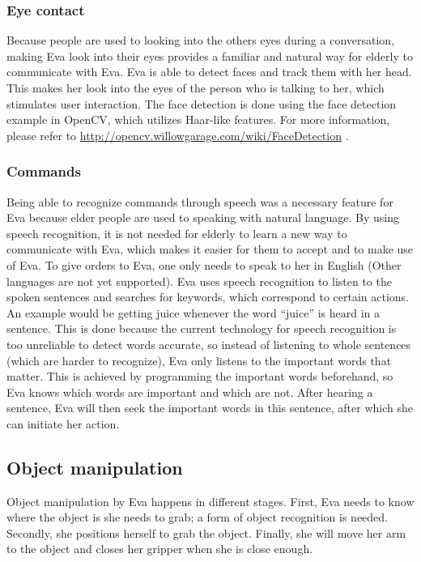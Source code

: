 \documentclass[project_eva.tex]{subfiles}
\begin{document}
\subsubsection*{Eye contact}
Because people are used to looking into the other\textquotesingle s eyes during a conversation, making Eva look into 
their eyes provides a familiar and natural way for elderly to communicate with Eva. Eva is able to detect faces and 
track them with her head. This makes her look into the eyes of the person who is talking to her, which stimulates user 
interaction. The face detection is done using the face detection example in OpenCV, which utilizes Haar-like features. 
For more information, please refer to \url{http://opencv.willowgarage.com/wiki/FaceDetection} \cite{FaceDetection} .

\subsubsection*{Commands}
Being able to recognize commands through speech was a necessary feature for Eva because elder people are used to speaking 
with natural language. By using speech recognition, it is not needed for elderly to learn a new way to communicate with 
Eva, which makes it easier for them to accept and to make use of Eva. To give orders to Eva, one only needs to speak to 
her in English (Other languages are not yet supported). Eva uses speech recognition to listen to the spoken sentences and 
searches for keywords, which correspond to certain actions. An example would be getting juice whenever the word ``juice'' 
is heard in a sentence. This is done because the current technology for speech recognition is too unreliable to detect 
words accurate, so instead of listening to whole sentences (which are harder to recognize), Eva only listens to the 
important words that matter. This is achieved by programming the important words beforehand, so Eva knows which words are important and which are not. After hearing a sentence, Eva will then seek the important words in this sentence, after which she can initiate her action.

\subsection*{Object manipulation}
Object manipulation by Eva happens in different stages. First, Eva needs to know where the object is she needs to grab; a 
form of object recognition is needed. Secondly, she  positions herself to grab the object. Finally, she will move her 
arm to the object and closes her gripper when she is close enough.
\end{document}
